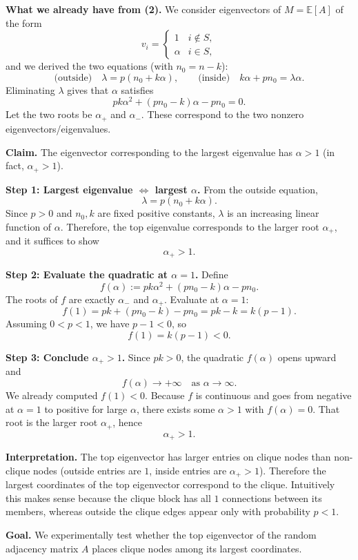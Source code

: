 \documentclass[10pt]{article}
\newcommand{\E}{\mathbb{E}}
\newcommand{\spara}[1]{\vspace{.5em}\noindent {\large\sffamily\textcolor{nyuOfficialPurple}{#1}}}
\begin{document}
\spara{Pr. 3(3)}

\textbf{What we already have from (2).}
We consider eigenvectors of $M=\E[A]$ of the form
\[
v_i=
\begin{cases}
1 & i\notin S,\\
\alpha & i\in S,
\end{cases}
\]
and we derived the two equations (with $n_0=n-k$):
\[
\text{(outside)}\quad \lambda = p(n_0+k\alpha),
\qquad
\text{(inside)}\quad k\alpha+pn_0=\lambda\alpha.
\]
Eliminating $\lambda$ gives that $\alpha$ satisfies
\[
pk\alpha^2 + (pn_0-k)\alpha - pn_0 = 0.
\]
Let the two roots be $\alpha_+$ and $\alpha_-$. These correspond to the two nonzero eigenvectors/eigenvalues.

\medskip
\noindent
\textbf{Claim.} The eigenvector corresponding to the largest eigenvalue has $\alpha>1$ (in fact, $\alpha_+>1$).

\medskip
\textbf{Step 1: Largest eigenvalue $\Longleftrightarrow$ largest $\alpha$.}
From the outside equation,
\[
\lambda = p(n_0+k\alpha).
\]
Since $p>0$ and $n_0,k$ are fixed positive constants, $\lambda$ is an increasing linear function of $\alpha$. Therefore, the top eigenvalue corresponds to the larger root $\alpha_+$, and it suffices to show
\[
\alpha_+>1.
\]

\medskip
\textbf{Step 2: Evaluate the quadratic at $\alpha=1$.}
Define
\[
f(\alpha):=pk\alpha^2+(pn_0-k)\alpha-pn_0.
\]
The roots of $f$ are exactly $\alpha_-$ and $\alpha_+$. Evaluate at $\alpha=1$:
\[
f(1)=pk+(pn_0-k)-pn_0 = pk-k = k(p-1).
\]
Assuming $0<p<1$, we have $p-1<0$, so
\[
f(1)=k(p-1)<0.
\]

\medskip
\textbf{Step 3: Conclude $\alpha_+>1$.}
Since $pk>0$, the quadratic $f(\alpha)$ opens upward and
\[
f(\alpha)\to +\infty \quad \text{as }\alpha\to\infty.
\]
We already computed $f(1)<0$. Because $f$ is continuous and goes from negative at $\alpha=1$ to positive for large $\alpha$, there exists some $\alpha>1$ with $f(\alpha)=0$. That root is the larger root $\alpha_+$, hence
\[
\boxed{\alpha_+>1.}
\]

\medskip
\textbf{Interpretation.}
The top eigenvector has larger entries on clique nodes than non-clique nodes (outside entries are $1$, inside entries are $\alpha_+>1$). Therefore the largest coordinates of the top eigenvector correspond to the clique. Intuitively this makes sense because the clique block has all $1$ connections between its members, whereas outside the clique edges appear only with probability $p<1$.

\spara{Pr. 3(4) (experimental verification)}
\textbf{Goal.}
We experimentally test whether the top eigenvector of the random adjacency matrix $A$ places clique
nodes among its largest coordinates.
\end{document}
